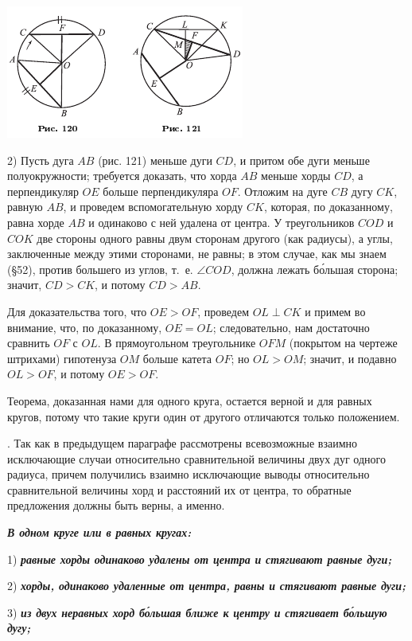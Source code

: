 \documentclass[oneside]{book}
\begin{document}
\includegraphics{pics/ris-120-121}

2) Пусть дуга $AB$ (рис. 121) меньше дуги $CD$, и притом обе дуги меньше полуокружности;
требуется доказать, что хорда $AB$ меньше хорды $CD$, а перпендикуляр $OE$ больше перпендикуляра $OF$.
Отложим на дуге $CB$ дугу $CK$, равную $AB$, и проведем вспомогательную хорду $CK$, которая, по доказанному, равна хорде $AB$ и одинаково с ней удалена от центра.
У треугольников $COD$ и $COK$ две стороны одного равны двум сторонам другого (как радиусы), а углы, заключенные между этими сторонами, не равны;
в этом случае, как мы знаем (§52), против большего из углов, т.~е.
$\angle COD$, должна лежать б\'{о}льшая сторона;
значит, $CD>CK$, и потому $CD>AB$.

Для доказательства того, что $OE>OF$, проведем $OL\perp CK$ и примем во внимание, что, по доказанному, $OE=OL$;
следовательно, нам достаточно сравнить $OF$ с $OL$.
В прямоугольном треугольнике $OFM$ (покрытом на чертеже штрихами) гипотенуза $OM$ больше катета $OF$;
но $OL>OM$;
значит, и подавно $OL>OF$, и потому $OE>OF$.

Теорема, доказанная нами для одного круга, остается верной и для равных кругов, потому что такие круги один от другого отличаются только положением.

.
Так как в предыдущем параграфе рассмотрены всевозможные взаимно исключающие случаи относительно сравнительной величины двух дуг одного радиуса, причем получились взаимно исключающие выводы относительно сравнительной величины хорд и расстояний их от центра, то обратные предложения должны быть верны, а именно.

\textbf{\emph{В одном круге или в равных кругах:}}

1) \textbf{\emph{равные хорды одинаково удалены от центра и стягивают равные дуги;}}

2) \textbf{\emph{хорды, одинаково удаленные от центра, равны и стягивают равные дуги;}}

3) \textbf{\emph{из двух неравных хорд б\'{о}льшая ближе к центру и стягивает б\'{о}льшую дугу;}}
\end{document}
